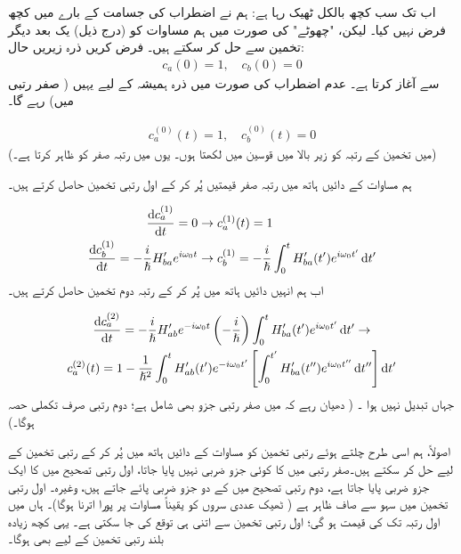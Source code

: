 اب تک سب کچھ بالکل ٹھیک   رہا ہے:  ہم نے اضطراب کی جسامت کے بارے میں کچھ فرض نہیں کیا۔ لیکن،   "چھوٹے"   کی صورت میں ہم مساوات  کو (درج ذیل)  یک بعد دیگر تخمین سے حل کر سکتے ہیں۔  فرض کریں ذرہ زیریں حال:
\begin{align}
	c_a(0)=1,\quad c_b(0)=0
\end{align}
سے آغاز کرتا ہے۔ عدم  اضطراب کی صورت میں ذرہ ہمیشہ کے لیے یہیں (  صفر رتبی میں)  رہے گا۔

\begin{align}
	c^{(0)}_a(t)=1,\quad c_b^{(0)}(t)=0
\end{align}
(میں تخمین کے رتبہ کو زیر  بالا میں   قوسین میں لکھتا ہوں۔ یوں  میں   رتبہ صفر کو ظاہر کرتا ہے۔)

ہم مساوات  کے دائیں ہاتھ میں  رتبہ صفر  قیمتیں پُر کر کے اول رتبی  تخمین حاصل کرتے ہیں۔

\begin{gather}
\begin{aligned}\label{مساوات_تابع_مضطرب_اول_رتبی}
		\frac{\dif c_a^{(1)}}{\dif t}=0&\to c_a^{(1)}(t)=1 \\
		\frac{\dif c_b^{(1)}}{\dif t}=-\frac{i}{\hslash}H'_{ba}e^{i\omega_0t}&\to c_b^{(1)}=-\frac{i}{\hslash}\int_{0}^{t}H'_{ba}(t')e^{i\omega_0t'}\dif t'
\end{aligned}
\end{gather}
اب ہم انہیں دائیں ہاتھ میں  پُر کر کے رتبہ دوم تخمین حاصل کرتے ہیں۔

\begin{multline}
		\frac{\dif c_a^{(2)}}{\dif t}=-\frac{i}{\hslash}H'_{ab}e^{-i\omega_0t}\left(-\frac{i}{\hslash}\right)\int_{0}^{t}H'_{ba}(t')e^{i\omega_0t'}\dif t'\to \\
		c_a^{(2)}(t)=1-\frac{1}{\hslash^2}\int_{0}^{t}H'_{ab}(t')e^{-i\omega_0t'}\left[\int_{0}^{t'}H'_{ba}(t'')e^{i\omega_0t''}\dif t''\right]\dif t'
\end{multline}
جہاں  تبدیل نہیں ہوا ۔ ( دھیان رہے کہ  میں صفر رتبی جزو بھی  شامل ہے؛  دوم  رتبی   صرف تکملی حصہ ہوگا۔)

اصولاً،  ہم اسی طرح چلتے ہوئے  رتبی تخمین کو مساوات  کے دائیں ہاتھ میں پُر کر کے  رتبی تخمین  کے لیے حل کر سکتے ہیں۔صفر  رتبی  میں  کا کوئی جزو ضربی نہیں پایا جاتا،    اول رتبی  تصحیح میں  کا ایک جزو ضربی پایا جاتا ہے،  دوم  رتبی تصحیح میں  کے دو جزو ضربی پائے جاتے ہیں، وغیرہ۔  اول رتبی تخمین میں سہو 
   سے صاف ظاہر ہے ( ٹھیک  عددی سروں کو یقیناً  مساوات   پر پورا اترنا ہوگا)۔ ہاں  میں  اول رتبہ   تک           کی قیمت   ہو گی؛   اول  رتبی تخمین سے اتنی ہی توقع کی جا سکتی ہے۔ یہی کچھ زیادہ بلند رتبی تخمین کے لیے بھی    ہوگا۔

